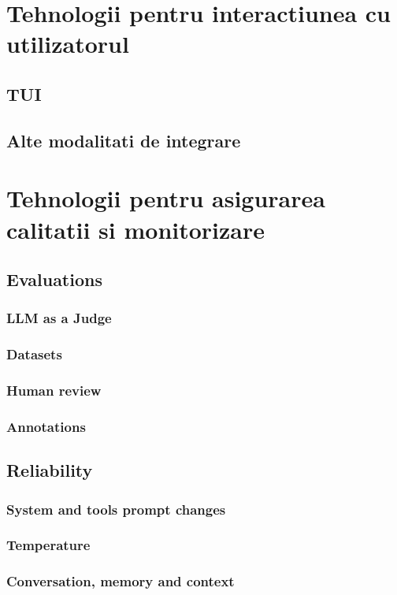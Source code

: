 \documentclass[12pt, a4paper, oneside, romanian, draft]{teza-upb}
\begin{document}
  \section{Tehnologii pentru interactiunea cu utilizatorul}
    
    \subsection{TUI}
    \subsection{Alte modalitati de integrare}


  \section{Tehnologii pentru asigurarea calitatii si monitorizare}
    \subsection{Evaluations}
      \subsubsection{LLM as a Judge}
      \subsubsection{Datasets}
      \subsubsection{Human review}
      \subsubsection{Annotations}
    \subsection{Reliability}
      \subsubsection{System and tools prompt changes}
      \subsubsection{Temperature}
      \subsubsection{Conversation, memory and context}
\end{document}
